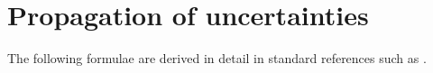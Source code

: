 \documentclass[a4paper,10pt, twocolumn]{article}
\begin{document}
%

\section{Propagation of uncertainties}
The following formulae are derived in detail in standard references such as \cite{GUM2023}.
\end{document}
